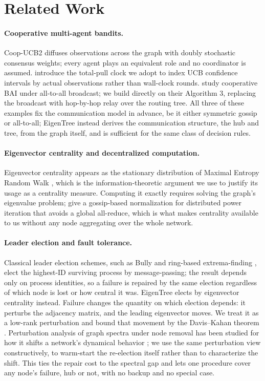 \documentclass[letterpaper]{article} %
\begin{document}
\section{Related Work}
\label{sec:related}

\paragraph{Cooperative multi-agent bandits.} Coop-UCB2
\citep{landgren2021distributed} diffuses observations across the graph with
doubly stochastic consensus weights; every agent plays an equivalent role and
no coordinator is assumed. \cite{martinez2019decentralized} introduce the
total-pull clock we adopt to index UCB confidence intervals by actual
observations rather than wall-clock rounds. \cite{hillel2013distributed} study
cooperative BAI under all-to-all broadcast; we build directly on their
Algorithm 3, replacing the broadcast with hop-by-hop relay over the routing
tree. All three of these examples fix the communication model in advance, be it
either symmetric gossip or all-to-all; EigenTree instead derives the
communication structure, the hub and tree, from the graph itself, and is
sufficient for the same class of decision rules.

\paragraph{Eigenvector centrality and decentralized computation.}
Eigenvector centrality appears as the stationary distribution of Maximal
Entropy Random Walk \citep{burda2009localization}, which is the
information-theoretic argument we use to justify its usage as a centrality
measure. Computing it exactly requires solving the graph's eigenvalue problem;
\cite{jelasity2007asynchronous} give a gossip-based normalization for
distributed power iteration that avoids a global all-reduce, which is what
makes centrality available to us without any node aggregating over the whole
network.

\paragraph{Leader election and fault tolerance.} Classical leader election
schemes, such as Bully \citep{garciamolina1982} and ring-based extrema-finding
\citep{changroberts1979}, elect the highest-ID surviving process by
message-passing; the result depends only on process identities, so a failure is
repaired by the same election regardless of which node is lost or how central
it was. EigenTree elects by eigenvector centrality instead. Failure changes the
quantity on which election depends: it perturbs the adjacency matrix, and the
leading eigenvector moves. We treat it as a low-rank perturbation and bound
that movement by the Davis--Kahan theorem \citep{daviskahan1970}. Perturbation
analysis of graph spectra under node removal has been studied for how it shifts
a network's dynamical behavior \citep{restrepo2006}; we use the same
perturbation view constructively, to warm-start the re-election itself rather
than to characterize the shift. This ties the repair cost to the spectral gap
and lets one procedure cover any node's failure, hub or not, with no backup and
no special case.
\end{document}
